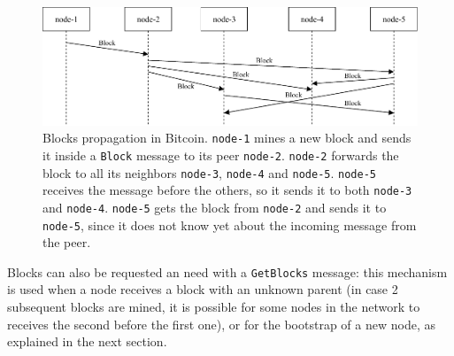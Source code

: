 \begin{figure}[ht]
	\centering
	\vspace*{0.4cm}
	\includegraphics[scale=1.04]{figures/block_propagation}
	\vspace*{0.25cm}
	\caption[Blocks propagation in Bitcoin]{
		Blocks propagation in Bitcoin.
		\texttt{node-1} mines a new block and sends it inside a \texttt{Block} message to its peer \texttt{node-2}.
		\texttt{node-2} forwards the block to all its neighbors \texttt{node-3}, \texttt{node-4} and \texttt{node-5}.
		\texttt{node-5} receives the message before the others, so it sends it to both \texttt{node-3} and \texttt{node-4}.
		\texttt{node-5} gets the block from \texttt{node-2} and sends it to \texttt{node-5}, since it does not know yet about the incoming message from the peer.
	}
	\label{fig:block-propagation}
\end{figure}

\bigskip
Blocks can also be requested an need with a \texttt{GetBlocks} message:
this mechanism is used when a node receives a block with an unknown parent (in case \num{2} subsequent blocks are mined, it is possible for some nodes in the network to receives the second before the first one), or for the bootstrap of a new node, as explained in the next section.


